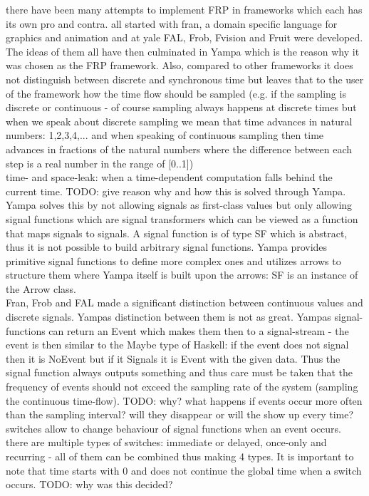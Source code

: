 there have been many attempts to implement FRP in frameworks which each has its own pro and contra. all started with fran, a domain specific language for graphics and animation and at yale FAL, Frob, Fvision and Fruit were developed. The ideas of them all have then culminated in Yampa which is the reason why it was chosen as the FRP framework. Also, compared to other frameworks it does not distinguish between discrete and synchronous time but leaves that to the user of the framework how the time flow should be sampled (e.g. if the sampling is discrete or continuous - of course sampling always happens at discrete times but when we speak about discrete sampling we mean that time advances in natural numbers: 1,2,3,4,... and when speaking of continuous sampling then time advances in fractions of the natural numbers where the difference between each step is a real number in the range of [0..1]) \\

time- and space-leak: when a time-dependent computation falls behind the current time. TODO: give reason why and how this is solved through Yampa. \\
Yampa solves this by not allowing signals as first-class values but only allowing signal functions which are signal transformers which can be viewed as a function that maps signals to signals. A signal function is of type SF which is abstract, thus it is not possible to build arbitrary signal functions. Yampa provides primitive signal functions to define more complex ones and utilizes arrows \cite{Hughes2004} to structure them where Yampa itself is built upon the arrows: SF is an instance of the Arrow class. \\

Fran, Frob and FAL made a significant distinction between continuous values and discrete signals. Yampas distinction between them is not as great. Yampas signal-functions can return an Event which makes them then to a signal-stream - the event is then similar to the Maybe type of Haskell: if the event does not signal then it is NoEvent but if it Signals it is Event with the given data. Thus the signal function always outputs something and thus care must be taken that the frequency of events should not exceed the sampling rate of the system (sampling the continuous time-flow). TODO: why? what happens if events occur more often than the sampling interval? will they disappear or will the show up every time? \\

switches allow to change behaviour of signal functions when an event occurs. there are multiple types of switches: immediate or delayed, once-only and recurring - all of them can be combined thus making 4 types. It is important to note that time starts with 0 and does not continue the global time when a switch occurs. TODO: why was this decided? \\

